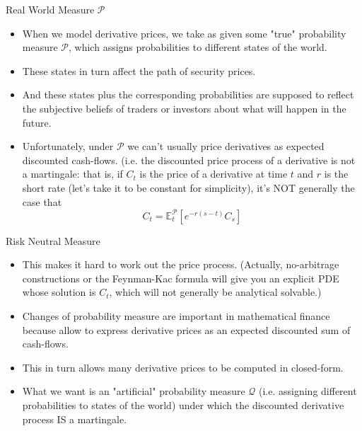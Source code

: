 \documentclass{beamer}
\begin{document}
\begin{frame}{Real World Measure $\mathcal{P}$}
\begin{itemize}
	\item When we model derivative prices, we take as given some "true" probability measure $\mathcal{P}$, which assigns probabilities to different states of the world. 
	\item These states in turn affect the path of security prices. 
	\item And these states plus the corresponding probabilities are supposed to reflect the subjective beliefs of traders or investors about what will happen in the future.
	\item Unfortunately, under $\mathcal{P}$ we can't usually price derivatives as expected discounted cash-flows. (i.e. the discounted price process of a derivative is not a martingale: that is, if $C_t$ is the price of a derivative at time $t$ and $r$ is the short rate (let's take it to be constant for simplicity), it's NOT generally the case that
	\begin{equation*}
		C_t=\mathbb{E}_t^{\mathcal{P}}[e^{-r(s-t)}C_s]
	\end{equation*}
	\end{itemize}
\end{frame}

\begin{frame}{Risk Neutral Measure}
\begin{itemize}
	\item This makes it hard to work out the price process. (Actually, no-arbitrage constructions or the Feynman-Kac formula will give you an explicit PDE whose solution is $C_t$, which will not generally be analytical solvable.)
	\item Changes of probability measure are important in mathematical finance because allow to express derivative prices as an expected discounted sum of cash-flows. 
	\item This in turn allows many derivative prices to be computed in closed-form.
	\item What we want is an "artificial" probability measure $\mathcal{Q}$ (i.e. assigning different probabilities to states of the world) under which the discounted derivative process IS a martingale.
	\end{itemize}
\end{frame}
\end{document}
